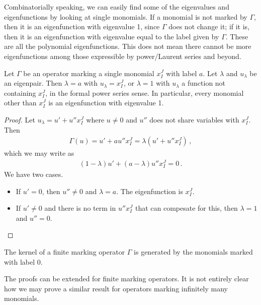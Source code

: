 Combinatorially speaking, we can easily find some of the eigenvalues and eigenfunctions by looking at single monomials. If a monomial is not marked by $\Gamma$, then it is an eigenfunction with eigenvalue 1, since $\Gamma$ does not change it; if it is, then it is an eigenfunction with eigenvalue equal to the label given by $\Gamma$. These are all the polynomial eigenfunctions. This does not mean there cannot be more eigenfunctions among those expressible by power/Laurent series and beyond.
\begin{prop} Let $\Gamma$ be an operator marking a single monomial $x_I^J$ with label $a$. Let $\lambda$ and $u_\lambda$ be an eigenpair. Then $\lambda = a$ with $u_\lambda = x_I^J$, or $\lambda = 1$ with $u_\lambda$ a function not containing $x_I^J$, in the formal power series sense. In particular, every monomial other than $x_I^J$ is an eigenfunction with eigenvalue 1.
\end{prop}
\begin{proof}
Let $u_\lambda = u' + u''x_I^J$ where $u \neq 0$ and $u''$ does not share variables with $x_I^J$. Then
\begin{align}
	\Gamma(u) = u' + au''x_I^J  = \lambda (u' + u''x_I^J)\,,
\end{align}
which we may write as
\begin{align}
	(1-\lambda) u' + (a-\lambda)u''x_I^J  = 0\,.
\end{align}
We have two cases.
\begin{itemize}
\item If $u' = 0$, then $u'' \neq 0$ and $\lambda = a$. The eigenfunction is $x_I^J$.
\item If $u' \neq 0$ and there is no term in $u''x_I^J$ that can compesate for this, then $\lambda = 1$ and $u'' = 0$.
\end{itemize}
\end{proof}

\begin{corollary} The kernel of a finite marking operator $\Gamma$ is generated by the monomials marked with label 0.
\end{corollary}

The proofs can be extended for finite marking operators. It is not entirely clear how we may prove a similar result for operators marking infinitely many monomials.

